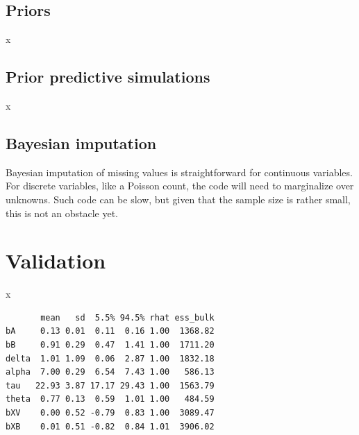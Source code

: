 \documentclass[reqno ,11pt]{amsart}
\begin{document}
\subsection{Priors}
x

\subsection{Prior predictive simulations}
x

\subsection{Bayesian imputation}

Bayesian imputation of missing values is straightforward for continuous variables. For discrete variables, like a Poisson count, the code will need to marginalize over unknowns. Such code can be slow, but given that the sample size is rather small, this is not an obstacle yet.

\section{Validation}

x

\begin{verbatim}
       mean   sd  5.5% 94.5% rhat ess_bulk
bA     0.13 0.01  0.11  0.16 1.00  1368.82
bB     0.91 0.29  0.47  1.41 1.00  1711.20
delta  1.01 1.09  0.06  2.87 1.00  1832.18
alpha  7.00 0.29  6.54  7.43 1.00   586.13
tau   22.93 3.87 17.17 29.43 1.00  1563.79
theta  0.77 0.13  0.59  1.01 1.00   484.59
bXV    0.00 0.52 -0.79  0.83 1.00  3089.47
bXB    0.01 0.51 -0.82  0.84 1.01  3906.02
\end{verbatim}
\end{document}
